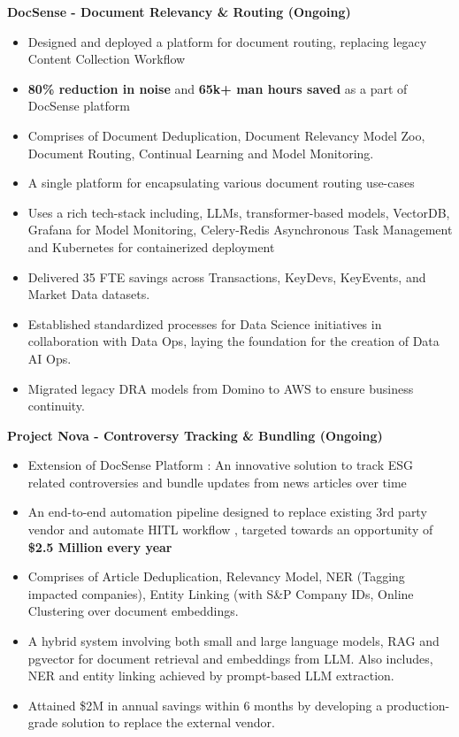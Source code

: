 \documentclass[letterpaper,11pt]{article}
\newcommand{\resumeProjectItem}[1]{
  \item\footnotesize{
    {#1 \vspace{-2pt}}
  }
}
\newcommand{\resumeProjectListStart}{\begin{itemize}[leftmargin=0.3in]}
\newcommand{\resumeProjectListEnd}{\end{itemize}\vspace{-3pt}}
\begin{document}
      \vspace{3pt}
      \textbf{DocSense - Document Relevancy \& Routing (Ongoing)}
      \resumeProjectListStart
        \resumeProjectItem{Designed and deployed a platform for document routing, replacing legacy Content Collection Workflow}
        \resumeProjectItem{\textbf{80\% reduction in noise} and \textbf{65k+ man hours saved} as a part of DocSense platform}
        \resumeProjectItem{Comprises of Document Deduplication, Document Relevancy Model Zoo, Document Routing, Continual Learning and Model Monitoring.}
        \resumeProjectItem{A single platform for encapsulating various document routing use-cases}
        \resumeProjectItem{Uses a rich tech-stack including, LLMs, transformer-based models, VectorDB, Grafana for Model Monitoring, Celery-Redis Asynchronous Task Management and Kubernetes for containerized deployment}
        \resumeProjectItem{Delivered 35 FTE savings across Transactions, KeyDevs, KeyEvents, and Market Data datasets.}
        \resumeProjectItem{Established standardized processes for Data Science initiatives in collaboration with Data Ops, laying the foundation for the creation of Data AI Ops.}
        \resumeProjectItem{Migrated legacy DRA models from Domino to AWS to ensure business continuity.}
      \resumeProjectListEnd

      \vspace{3pt}
      \textbf{Project Nova - Controversy Tracking \& Bundling (Ongoing)}
      \resumeProjectListStart
        \resumeProjectItem{Extension of DocSense Platform : An innovative solution to track ESG related controversies and bundle updates from news articles over time}
        \resumeProjectItem{An end-to-end automation pipeline designed to replace existing 3rd party vendor and automate HITL workflow , targeted towards an opportunity of \textbf{\$2.5 Million every year}}
        \resumeProjectItem{Comprises of Article Deduplication, Relevancy Model, NER (Tagging impacted companies), Entity Linking (with S\&P Company IDs, Online Clustering over document embeddings.}
        \resumeProjectItem{A hybrid system involving both small and large language models, RAG and pgvector for document retrieval and embeddings from LLM. Also includes, NER and entity linking achieved by prompt-based LLM extraction.}
        \resumeProjectItem{Attained \$2M in annual savings within 6 months by developing a production-grade solution to replace the external vendor.}
        
      \resumeProjectListEnd
\end{document}
